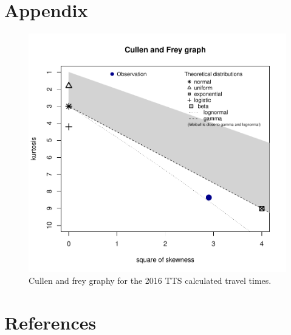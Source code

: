 \documentclass[]{elsarticle} %
\begin{document}
\hypertarget{appendix}{%
\section{Appendix}\label{appendix}}

\newpage

\begin{figure}

{\centering \includegraphics[width=1\linewidth]{Spatial-Availability_files/figure-latex/plot-cullen-frey-1} 

}

\caption{\label{fig:plot-cullen-frey}Cullen and frey graphy for the 2016 TTS calculated travel times.}\label{fig:plot-cullen-frey}
\end{figure}

\hypertarget{references}{%
\section*{References}\label{references}}
\end{document}
